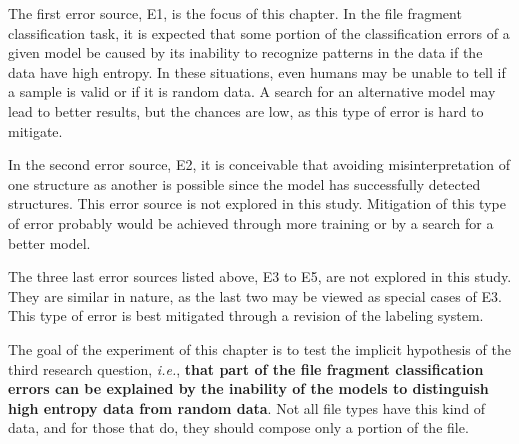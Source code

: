 The first error source, E1, is the focus of this chapter. In the file fragment classification task, it is expected that some portion of the classification errors of a given model be caused by its inability to recognize patterns in the data if the data have high entropy. In these situations, even humans may be unable to tell if a sample is valid or if it is random data. A search for an alternative model may lead to better results, but the chances are low, as this type of error is hard to mitigate. 

In the second error source, E2, it is conceivable that avoiding misinterpretation of one structure as another is possible since the model has successfully detected structures. This error source is not explored in this study. Mitigation of this type of error probably would be achieved through more training or by a search for a better model.

The three last error sources listed above, E3 to E5, are not explored in this study. They are similar in nature, as the last two may be viewed as special cases of E3. This type of error is best mitigated through a revision of the labeling system.


The goal of the experiment of this chapter is to test the implicit hypothesis of the third research question, \textit{i.e.}, \textbf{that part of the file fragment classification errors can be explained by the inability of the models to distinguish high entropy data from random data}. Not all file types have this kind of data, and for those that do, they should compose only a portion of the file.


